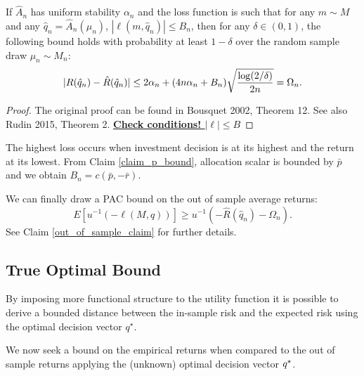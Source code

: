 \documentclass[11pt]{article}
\begin{document}
\begin{thm}
  \label{thm2}
  If $\hat A_n$ has uniform stability $\alpha_n$ and the loss function is such that for
  any $m\sim M$ and any $\hat q_n=\hat A_n(\mu_n)$, $|\ell(m,\hat q_n)|\leq B_n$, then for
  any $\delta\in(0,1)$, the following bound holds with probability at least $1-\delta$
  over the random sample draw $\mu_n\sim M_n$:
  \begin{equation*}
    |R({\hat q}_n) - \hat R({\hat q}_n)| \leq 2\alpha_n + (4n\alpha_n +
    B_n)\sqrt{\frac{\log(2/\delta)}{2n}} = \Omega_n.
  \end{equation*}
\end{thm}

\begin{proof}
  The original proof can be found in Bousquet 2002, Theorem 12. See also Rudin 2015,
  Theorem 2. \underline{\textbf{Check conditions! $|\ell|\leq B$}}
\end{proof}

\begin{rem}
  The highest loss occurs when investment decision is at its highest and the return at its
  lowest. From Claim \ref{claim_p_bound}, allocation scalar is bounded by $\bar p$ and we
  obtain $B_n = c(\bar p, -\bar r)$.
\end{rem}

We can finally draw a PAC bound on the out of sample average returns:
\begin{equation}
  E[u^{-1}(-\ell(M,q))] \geq u^{-1}(-\hat R(\hat q_n) - \Omega_n).
\end{equation}
See Claim \ref{out_of_sample_claim} for further details.
 
\subsection{True Optimal Bound}

By imposing more functional structure to the utility function it is possible to derive a
bounded distance between the in-sample risk and the expected risk using the optimal
decision vector $q^\star$. 

We now seek a bound on the empirical returns when compared to the out of sample returns
applying the (unknown) optimal decision vector ${q^\star}$. 
\end{document}
